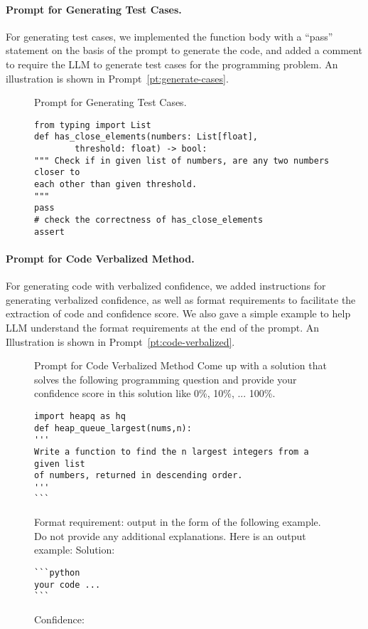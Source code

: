 \paragraph{Prompt for Generating Test Cases.}
For generating test cases, we implemented the function body with a ``pass'' statement on the basis of the prompt to generate the code, and added a comment to require the LLM to generate test cases for the programming problem. An illustration is shown in Prompt~\ref{pt:generate-cases}.

\begin{figure}[ht]
\begin{promptbox}[label=pt:generate-cases]{Prompt for Generating Test Cases.}
\begin{lstlisting}
from typing import List
def has_close_elements(numbers: List[float], 
        threshold: float) -> bool:
""" Check if in given list of numbers, are any two numbers closer to
each other than given threshold.
"""
pass
# check the correctness of has_close_elements
assert
\end{lstlisting}
\end{promptbox}
\end{figure}

\paragraph{Prompt for Code Verbalized Method.}
For generating code with verbalized confidence, we added instructions for generating verbalized confidence, as well as format requirements to facilitate the extraction of code and confidence score. We also gave a simple example to help LLM understand the format requirements at the end of the prompt. 
An Illustration is shown in Prompt~\ref{pt:code-verbalized}.

\begin{figure}[ht]
\begin{promptbox}[label=pt:code-verbalized]{Prompt for Code Verbalized Method}
Come up with a solution that solves the following programming question and
provide your confidence score in this solution like 0\%, 10\%, ... 100\%.
\begin{lstlisting}
import heapq as hq
def heap_queue_largest(nums,n):
'''
Write a function to find the n largest integers from a given list 
of numbers, returned in descending order.
'''
```
\end{lstlisting}
Format requirement: output in the form of the following example. Do not
provide any additional explanations.
Here is an output example:
Solution:
\begin{lstlisting}
```python
your code ...
```
\end{lstlisting}
Confidence: 
\end{promptbox}
\end{figure}